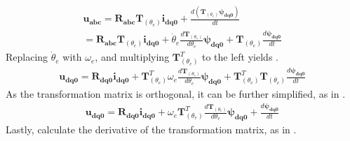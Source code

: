 \begin{equation}
	\begin{aligned}
		\mathbf{u_{abc}}
		=
		\mathbf{R_{abc}}
		\mathbf{T}_{(\theta_e)} \mathbf{i_{dq0}}
		+
		\frac{d\left(\mathbf{T}_{(\theta_e)} \pmb{\psi_{dq0}}\right)}{dt}
		\\
		=
		\mathbf{R_{abc}}
		\mathbf{T}_{(\theta_e)} \mathbf{i_{dq0}}
		+\dot{\theta}_e\frac{d\mathbf{T}_{(\theta_e)}}{d\theta_e}\pmb{\psi_{dq0}}
		+\mathbf{T}_{(\theta_e)}\frac{d \pmb{\psi_{dq0}}}{dt}
	\end{aligned}
	\label{eq:voltage_balance_dq0_intermediary}
\end{equation}
Replacing $\dot{\theta}_e$ with $\omega_e$, and multiplying $\mathbf{T}^T_{(\theta_e)}$ to the left yields .
\begin{equation}
	\begin{aligned}
		\mathbf{u_{dq0}}
		=
		\mathbf{R_{dq0}}\mathbf{i_{dq0}}
		+\mathbf{T}^T_{(\theta_e)}\omega_e\frac{d\mathbf{T}_{(\theta_e)}}{d\theta_e}\pmb{\psi_{dq0}}
		+\mathbf{T}^T_{(\theta_e)}\mathbf{T}_{(\theta_e)}\frac{d \pmb{\psi_{dq0}}}{dt}
	\end{aligned}
	\label{eq:voltage_balance_dq0_intermediary2}
\end{equation}
As the transformation matrix is orthogonal, it can be further simplified, as in .
\begin{equation}
	\begin{aligned}
		\mathbf{u_{dq0}}
		=
		\mathbf{R_{dq0}}\mathbf{i_{dq0}}
		+\omega_e\mathbf{T}^T_{(\theta_e)}\frac{d\mathbf{T}_{(\theta_e)}}{d\theta_e}\pmb{\psi_{dq0}}
		+\frac{d \pmb{\psi_{dq0}}}{dt}
	\end{aligned}
	\label{eq:voltage_balance_dq0_intermediary3}
\end{equation}
Lastly, calculate the derivative of the transformation matrix, as in .
